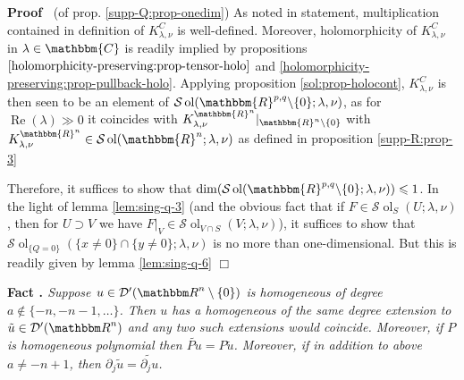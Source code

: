 \documentclass{article}
\newcommand{\nin}{\not\in}
\newcommand{\tmop}[1]{\ensuremath{\operatorname{#1}}}
\newcommand{\tmtextbf}[1]{{\bfseries{#1}}}
\newcommand{\tmtextit}[1]{{\itshape{#1}}}
\newcommand{\tmtextup}[1]{{\upshape{#1}}}
\newenvironment{proof}{\noindent\textbf{Proof\ }}{\hspace*{\fill}$\Box$\medskip}
\numberwithin{definition}{section}
\numberwithin{lemma}{section}
\numberwithin{proposition}{section}
{\theorembodyfont{\rmfamily}\newtheorem{remark}{Remark}
\numberwithin{remark}{section}
}
\newcommand{\D}{\mathcal{D}} \newcommand{\supp}{supp}
\begin{document}
\begin{proof}
  (of prop. \ref{supp-Q:prop-onedim}) As noted in statement, multiplication
  contained in definition of $K_{\lambda, \nu}^C$ is well-defined. Moreover,
  holomorphicity of $K_{\lambda, \nu}^C$ in $\lambda \in \mathbbm{C}$ is
  readily implied by propositions
  $\ref{holomorphicity-preserving:prop-tensor-holo}$ and
  \ref{holomorphicity-preserving:prop-pullback-holo}. Applying proposition
  \ref{sol:prop-holocont}, $K_{\lambda, \nu}^C$ is then seen to be an element
  of $\mathcal{S} \tmop{ol} ( \mathbbm{R}^{p, q} \backslash \{ 0 \} ; \lambda,
  \nu)$, as for $\tmop{Re} ( \lambda) \gg 0$ it coincides with $K_{\lambda,
  \nu}^{\mathbbm{R}^n} |_{\mathbbm{R}^n \backslash \{ 0 \}}$ with $K_{\lambda,
  \nu}^{\mathbbm{R}^n} \in \mathcal{S} \tmop{ol} ( \mathbbm{R}^n ; \lambda,
  \nu)$ as defined in proposition \ref{supp-R:prop-3}
  
  Therefore, it suffices to show that $\dim ( \mathcal{S} \tmop{ol} (
  \mathbbm{R}^{p, q} \backslash \{ 0 \} ; \lambda, \nu)) \leqslant 1$. In the
  light of lemma \ref{lem:sing-q-3} (and the obvious fact that if $F \in
  \mathcal{S} \tmop{ol}_S ( U ; \lambda, \nu)$, then for $U \supset V$ we have
  $F |_V \in \mathcal{S} \tmop{ol}_{V \cap S} ( V ; \lambda, \nu)$), it
  suffices to show that $\mathcal{S} \tmop{ol}_{\{ Q = 0 \}} ( \{ x \neq 0 \}
  \cap \{ y \neq 0 \} ; \lambda, \nu)$ is no more than one-dimensional. But
  this is readily given by lemma \ref{lem:sing-q-6}
\end{proof}

{\noindent}\tmtextbf{Fact \tmtextup{18}. }\tmtextit{ {\cite[thm
3.2.3]{hormander1983analysis}} Suppose $u \in \D' ( \R^n \setminus \{ 0 \})$
is homogeneous of degree $a \nin \{ - n, - n - 1, \ldots \}$. Then $u$ has a
homogeneous of the same degree extension to $\tilde{u} \in \D' ( \R^n)$ and
any two such extensions would coincide. Moreover, if $P$ is homogeneous
polynomial then $\widetilde{Pu} = P \tilde{u}$. Moreover, if in addition to
above $a \neq - n + 1$, then $\partial_j  \tilde{u} = \widetilde{\partial_j
u}$.\label{fact:sing-q}}{\hspace*{\fill}}{\medskip}
\end{document}
